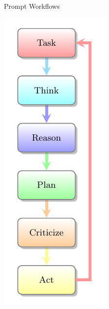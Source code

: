 \documentclass{beamer}
\begin{document}
\begin{frame}{Prompt Workflows}
\begin{minipage}[c][\textheight][c]{0.18\linewidth}
  \includegraphics[width=\linewidth,keepaspectratio]{./tikz-prompt-workflow-autogpt.pdf}

\end{minipage}
\end{frame}
\end{document}
